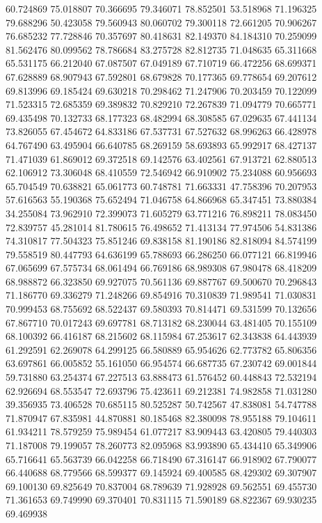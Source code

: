 60.724869
75.018807
70.366695
79.346071
78.852501
53.518968
71.196325
79.688296
50.423058
79.560943
80.060702
79.300118
72.661205
70.906267
76.685232
77.728846
70.357697
80.418631
82.149370
84.184310
70.259099
81.562476
80.099562
78.786684
83.275728
82.812735
71.048635
65.311668
65.531175
66.212040
67.087507
67.049189
67.710719
66.472256
68.699371
67.628889
68.907943
67.592801
68.679828
70.177365
69.778654
69.207612
69.813996
69.185424
69.630218
70.298462
71.247906
70.203459
70.122099
71.523315
72.685359
69.389832
70.829210
72.267839
71.094779
70.665771
69.435498
70.132733
68.177323
68.482994
68.308585
67.029635
67.441134
73.826055
67.454672
64.833186
67.537731
67.527632
68.996263
66.428978
64.767490
63.495904
66.640785
68.269159
58.693893
65.992917
68.427137
71.471039
61.869012
69.372518
69.142576
63.402561
67.913721
62.880513
62.106912
73.306048
68.410559
72.546942
66.910902
75.234088
60.956693
65.704549
70.638821
65.061773
60.748781
71.663331
47.758396
70.207953
57.616563
55.190368
75.652494
71.046758
64.866968
65.347451
73.880384
34.255084
73.962910
72.399073
71.605279
63.771216
76.898211
78.083450
72.839757
45.281014
81.780615
76.498652
71.413134
77.974506
54.831386
74.310817
77.504323
75.851246
69.838158
81.190186
82.818094
84.574199
79.558519
80.447793
64.636199
65.788693
66.286250
66.077121
66.819946
67.065699
67.575734
68.061494
66.769186
68.989308
67.980478
68.418209
68.988872
66.323850
69.927075
70.561136
69.887767
69.500670
70.296843
71.186770
69.336279
71.248266
69.854916
70.310839
71.989541
71.030831
70.999453
68.755692
68.522437
69.580393
70.814471
69.531599
70.132656
67.867710
70.017243
69.697781
68.713182
68.230044
63.481405
70.155109
68.100392
66.416187
68.215602
68.115984
67.253617
62.343838
64.443939
61.292591
62.269078
64.299125
66.580889
65.954626
62.773782
65.806356
63.697861
66.005852
55.161050
66.954574
66.687735
67.230742
69.001844
59.731880
63.254374
67.227513
63.888473
61.576452
60.448843
72.532194
62.926694
68.553547
72.693796
75.423611
69.212381
74.982858
71.031280
39.356935
73.406528
70.685115
80.525287
50.742567
47.838081
54.747788
71.870947
67.835981
44.870881
80.185468
82.380098
78.955188
79.104611
61.934211
78.579259
75.989454
61.077217
83.909443
63.420805
79.440303
71.187008
79.199057
78.260773
82.095968
83.993890
65.434410
65.349906
65.716641
65.563739
66.042258
66.718490
67.316147
66.918902
67.790077
66.440688
68.779566
68.599377
69.145924
69.400585
68.429302
69.307907
69.100130
69.825649
70.837004
68.789639
71.928928
69.562551
69.455730
71.361653
69.749990
69.370401
70.831115
71.590189
68.822367
69.930235
69.469938
